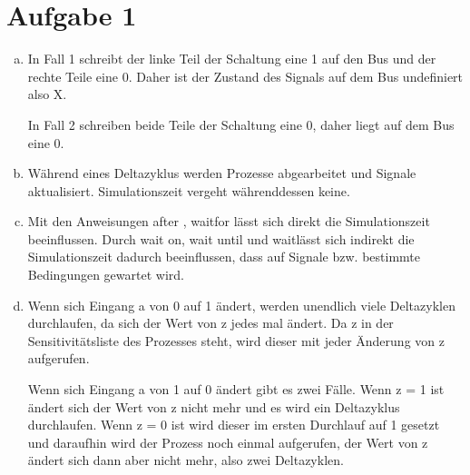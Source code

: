 \documentclass[a4paper]{scrartcl}
\begin{document}
	
	\section*{Aufgabe 1}
	
	\begin{enumerate}[(a)]
		
\item In Fall 1 schreibt der linke Teil der Schaltung eine 1 auf den Bus und der rechte Teile eine 0. Daher ist der Zustand des Signals auf dem Bus undefiniert also X.

In Fall 2 schreiben beide Teile der Schaltung eine 0, daher liegt auf dem Bus eine 0.

\item Während eines Deltazyklus werden Prozesse abgearbeitet und Signale aktualisiert. Simulationszeit vergeht währenddessen keine.

\item Mit den Anweisungen \glqq after \grqq, \glqq wait\grqq for lässt sich direkt die Simulationszeit beeinflussen. Durch \glqq wait on\grqq, \glqq wait until \grqq und \glqq wait\grqq lässt sich indirekt die Simulationszeit dadurch beeinflussen, dass auf Signale bzw. bestimmte Bedingungen gewartet wird.

\item Wenn sich Eingang a von 0 auf 1 ändert, werden unendlich viele Deltazyklen durchlaufen, da sich der Wert von z jedes mal ändert. Da z in der Sensitivitätsliste des Prozesses steht, wird dieser mit jeder Änderung von z aufgerufen. 

Wenn sich Eingang a von 1 auf 0 ändert gibt es zwei Fälle. Wenn z = 1 ist ändert sich der Wert von z nicht mehr und es wird ein Deltazyklus durchlaufen.
Wenn z = 0 ist wird dieser im ersten Durchlauf auf 1 gesetzt und daraufhin wird der Prozess noch einmal aufgerufen, der Wert von z ändert sich dann aber nicht mehr, also zwei Deltazyklen. 

	
	\end{enumerate}

	
\end{document}

